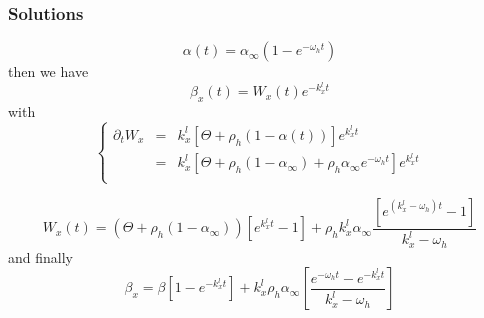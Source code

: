 \documentclass[aps,onecolumn,12pt]{revtex4}
\begin{document}
\subsubsection{Solutions}

\begin{equation}
	\alpha(t) = \alpha_\infty \left(1-e^{-\omega_ht}\right)
\end{equation}
then we have
\begin{equation}
	\beta_x(t) = W_x(t) e^{-k_x^l t }
\end{equation}
with
\begin{equation}
\left \lbrace
\begin{array}{rcl}
	\partial_tW_x & = & k_x^l \left[ \Theta + \rho_h(1-\alpha(t)) \right] e^{k_x^lt} \\
	& = & k_x^l \left[ \Theta + \rho_h(1-\alpha_\infty) + \rho_h\alpha_\infty e^{-\omega_h t} \right] e^{k_x^lt} \\
\end{array}
\right.
\end{equation}
	
\begin{equation}
		W_x(t) = \left(\Theta+\rho_h(1-\alpha_\infty)\right) \left[e^{k_x^l t}-1\right]
		+ \rho_h k_x^l \alpha_\infty \dfrac{\left[e^{\left(k_x^l-\omega_h\right) t}-1\right]}{k_x^l-\omega_h}
\end{equation}	
and finally
\begin{equation}
	\beta_x = \beta \left[1-e^{-k_x^l t}\right] 
	+ k_x^l \rho_h \alpha_\infty
	\left[
	 \dfrac{
	 e^{-\omega_h t} - e^{-k_x^l t}
	 }
	 {k_x^l-\omega_h}
	 \right]
\end{equation}
\end{document}
